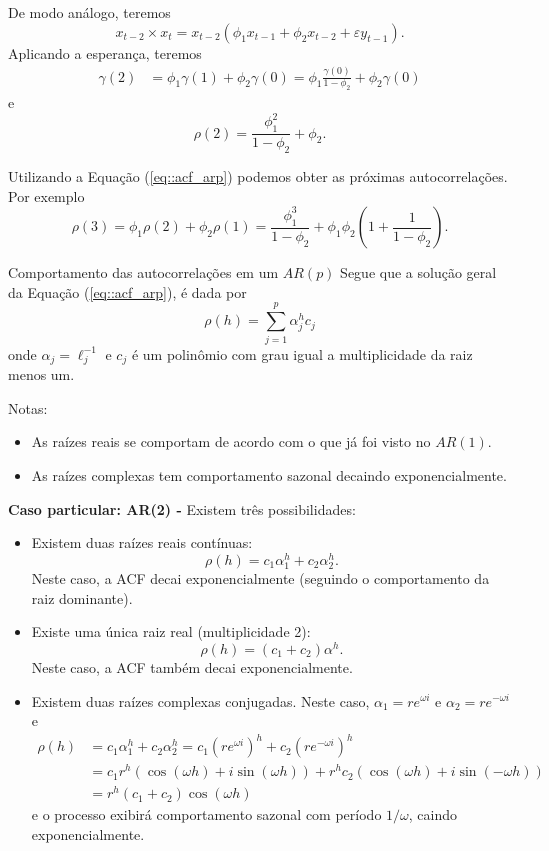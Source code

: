 \documentclass[
  letterpaper,
  DIV=11,
  numbers=noendperiod]{scrreprt}
\theoremstyle{definition}
\theoremstyle{plain}
\theoremstyle{definition}
\theoremstyle{plain}
\theoremstyle{remark}
\begin{document}
\begin{frame}
    De modo análogo, teremos
    $$x_{t-2}\times x_{t}=x_{t-2}\left(\phi_1x_{t-1}+\phi_2x_{t-2}+\varepsilon y_{t-1}\right).$$
    Aplicando a esperança, teremos
    \begin{align*}
    \gamma(2)&=\phi_1 \gamma(1)+\phi_2\gamma(0) = \phi_1 \frac{\gamma(0)}{1-\phi_2}+\phi_2\gamma(0)
    \end{align*}
    e
    $$\rho(2)=\frac{\phi_1^2}{1-\phi_2} + \phi_2.$$
\end{frame}

\begin{frame}
    Utilizando a Equação (\ref{eq::acf_arp}) podemos obter as próximas autocorrelações. Por exemplo
    $$\rho(3) = \phi_1\rho(2)+ \phi_2\rho(1)= \frac{\phi_1^3}{1-\phi_2} + \phi_1\phi_2\left(1 + \frac{1}{1-\phi_2}\right).$$    
\end{frame}

\begin{frame}{Comportamento das autocorrelações em um $AR(p)$}
    Segue que a solução geral da Equação (\ref{eq::acf_arp}), é dada por 
    $$\rho(h)=\sum_{j=1}^{p}\alpha_j^h c_j$$
    onde $\alpha_j=\ell_j^{-1}$ e $c_j$ é um polinômio com grau igual a multiplicidade da raiz menos um.
    
    Notas:
    \begin{itemize}
        \item As raízes reais se comportam de acordo com o que já foi visto no $AR(1)$.
        \item As raízes complexas tem comportamento sazonal decaindo exponencialmente. 
    \end{itemize}
\end{frame}

\begin{frame}
    \textbf{Caso particular: AR(2) -} Existem três possibilidades:
    \begin{itemize}
        \item Existem duas raízes reais contínuas:
        $$\rho(h)=c_1\alpha_1^h + c_2\alpha_2^h.$$
        Neste caso, a ACF decai exponencialmente (seguindo o comportamento da raiz dominante).
        \item Existe uma única raiz real (multiplicidade 2):
        $$\rho(h)=  (c_1+c_2)\alpha^h.$$
        Neste caso, a ACF também decai exponencialmente.
        \item Existem duas raízes complexas conjugadas. Neste caso, $\alpha_1=re^{\omega \textit{i}}$ e $\alpha_2=re^{-\omega \textit{i}}$ e
        \begin{align*}
        \rho(h)& = c_1\alpha_1^h + c_2\alpha_2^h  = c_1\left( re^{\omega \textit{i}} \right)^h + c_2\left( re^{-\omega \textit{i}} \right)^h\\
        &= c_1r^h\left( \cos(\omega h) + i\sin(\omega h) \right) + r^hc_2\left( \cos(\omega h) + i\sin(-\omega h) \right)\\
        &= r^h(c_1+c_2)\cos(\omega h)
        \end{align*}
        e o processo exibirá comportamento sazonal com período $1/\omega$, caindo exponencialmente.
    \end{itemize}
\end{frame}
\end{document}
